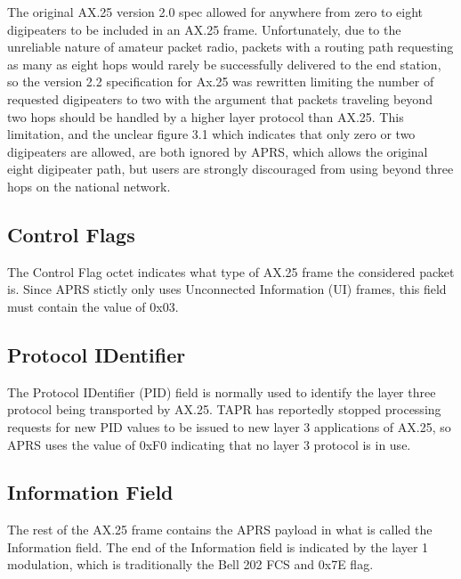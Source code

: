 The original AX.25 version 2.0 spec allowed for anywhere from zero to eight digipeaters to
be included in an AX.25 frame. Unfortunately, due to the unreliable nature of amateur 
packet radio, packets with a routing path requesting as many as eight hops would rarely be 
successfully delivered to the end station, so the version 2.2 specification for Ax.25 was
rewritten limiting the number of requested digipeaters to two with the argument that packets
traveling beyond two hops should be handled by a higher layer protocol than AX.25.
This limitation, and the unclear figure 3.1 which indicates that only zero or two digipeaters
are allowed, are both ignored by APRS, which allows the original eight digipeater path, but
users are strongly discouraged from using beyond three hops on the national network.

\subsection{Control Flags}

The Control Flag octet indicates what type of AX.25 frame the considered packet is. 
Since APRS stictly only uses Unconnected Information (UI) frames, this field must
contain the value of 0x03.

\subsection{Protocol IDentifier}

The Protocol IDentifier (PID) field is normally used to identify the layer three protocol
being transported by AX.25. TAPR has reportedly stopped processing requests for new PID
values to be issued to new layer 3 applications of AX.25, so APRS uses the value of
0xF0 indicating that no layer 3 protocol is in use.

\subsection{Information Field}

The rest of the AX.25 frame contains the APRS payload in what is called the Information field.
The end of the Information field is indicated by the layer 1 modulation, which is traditionally
the Bell 202 FCS and 0x7E flag.


